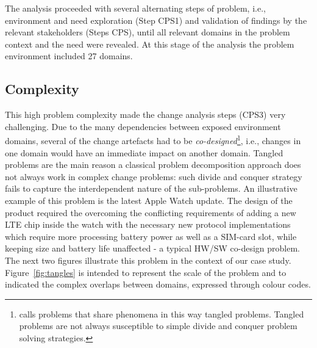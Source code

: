 \documentclass[runningheads,a4paper]{llncs}
\begin{document}
The analysis proceeded with several alternating steps of problem, i.e., environment and need exploration (Step CPS1) and validation of findings by the relevant stakeholders (Steps CPS), until all relevant domains in the problem context and the need were revealed. At this stage of the analysis the problem environment included 27 domains.%


\subsection{Complexity}
This high problem complexity made the change analysis steps (CPS3) very challenging. Due to the many dependencies between exposed environment domains, several of the change artefacts had to be \textit{co-designed}\footnote{\POE{} calls problems that share phenomena in this way tangled problems. Tangled problems are not always susceptible to simple divide and conquer problem solving strategies.}, i.e.,  changes in one domain would have an immediate impact on another domain. Tangled problems are the main reason a classical problem decomposition approach does not always work in complex change problems: such divide and conquer strategy fails to capture the interdependent nature of the sub-problems. An illustrative example of this problem is the latest Apple Watch update. The design of the product required the overcoming the conflicting requirements of adding a new LTE chip inside the watch with the necessary new protocol implementations which require more processing battery power as well as a SIM-card slot, while keeping size and battery life unaffected - a typical HW/SW co-design problem. The next two figures illustrate this problem in the context of our case study. Figure~\ref{fig:tangles} is intended to represent the scale of the problem and to indicated the complex overlaps between domains, expressed through colour codes.
\end{document}
